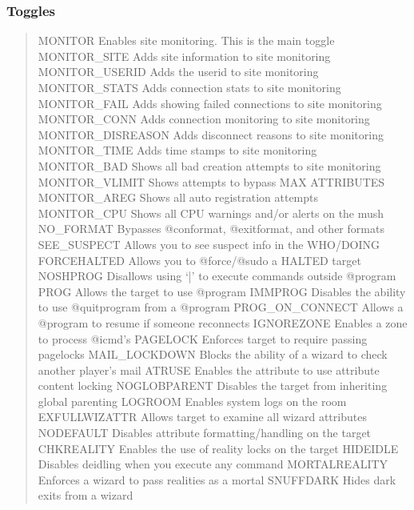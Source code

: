 \documentclass[letterpaper,10pt,english]{sphinxmanual}
\begin{document}
\subsubsection{Toggles}
\label{\detokenize{security:toggles}}\begin{quote}

\sphinxAtStartPar
MONITOR            \sphinxhyphen{} Enables site monitoring.  This is the main toggle
MONITOR\_SITE       \sphinxhyphen{} Adds site information to site monitoring
MONITOR\_USERID     \sphinxhyphen{} Adds the userid to site monitoring
MONITOR\_STATS      \sphinxhyphen{} Adds connection stats to site monitoring
MONITOR\_FAIL       \sphinxhyphen{} Adds showing failed connections to site monitoring
MONITOR\_CONN       \sphinxhyphen{} Adds connection monitoring to site monitoring
MONITOR\_DISREASON  \sphinxhyphen{} Adds disconnect reasons to site monitoring
MONITOR\_TIME       \sphinxhyphen{} Adds time stamps to site monitoring
MONITOR\_BAD        \sphinxhyphen{} Shows all bad creation attempts to site monitoring
MONITOR\_VLIMIT     \sphinxhyphen{} Shows attempts to bypass MAX ATTRIBUTES
MONITOR\_AREG       \sphinxhyphen{} Shows all auto registration attempts
MONITOR\_CPU        \sphinxhyphen{} Shows all CPU warnings and/or alerts on the mush
NO\_FORMAT          \sphinxhyphen{} Bypasses @conformat, @exitformat, and other formats
SEE\_SUSPECT        \sphinxhyphen{} Allows you to see suspect info in the WHO/DOING
FORCEHALTED        \sphinxhyphen{} Allows you to @force/@sudo a HALTED target
NOSHPROG           \sphinxhyphen{} Disallows using ‘|’ to execute commands outside @program
PROG               \sphinxhyphen{} Allows the target to use @program
IMMPROG            \sphinxhyphen{} Disables the ability to use @quitprogram from a @program
PROG\_ON\_CONNECT    \sphinxhyphen{} Allows a @program to resume if someone reconnects
IGNOREZONE         \sphinxhyphen{} Enables a zone to process @icmd’s
PAGELOCK           \sphinxhyphen{} Enforces target to require passing pagelocks
MAIL\_LOCKDOWN      \sphinxhyphen{} Blocks the ability of a wizard to check another player’s mail
ATRUSE             \sphinxhyphen{} Enables the attribute to use attribute content locking
NOGLOBPARENT       \sphinxhyphen{} Disables the target from inheriting global parenting
LOGROOM            \sphinxhyphen{} Enables system logs on the room
EXFULLWIZATTR      \sphinxhyphen{} Allows target to examine all wizard attributes
NODEFAULT          \sphinxhyphen{} Disables attribute formatting/handling on the target
CHKREALITY         \sphinxhyphen{} Enables the use of reality locks on the target
HIDEIDLE           \sphinxhyphen{} Disables deidling when you execute any command
MORTALREALITY      \sphinxhyphen{} Enforces a wizard to pass realities as a mortal
SNUFFDARK          \sphinxhyphen{} Hides dark exits from a wizard
\end{quote}
\end{document}
